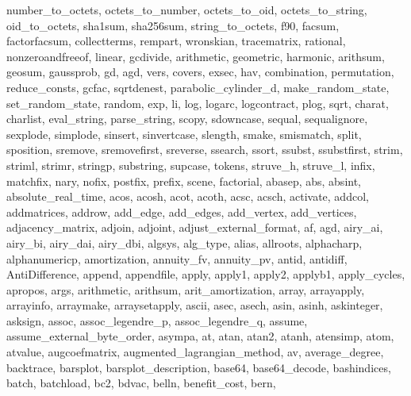 {{    number_to_octets,
    octets_to_number,
    octets_to_oid,
    octets_to_string,
    oid_to_octets,
    sha1sum,
    sha256sum,
    string_to_octets,
    f90,
    facsum,
    factorfacsum,
    collectterms,
    rempart,
    wronskian,
    tracematrix,
    rational,
    nonzeroandfreeof,
    linear,
    gcdivide,
    arithmetic,
    geometric,
    harmonic,
    arithsum,
    geosum,
    gaussprob,
    gd,
    agd,
    vers,
    covers,
    exsec,
    hav,
    combination,
    permutation,
    reduce_consts,
    gcfac,
    sqrtdenest,
    parabolic_cylinder_d,
    make_random_state,
    set_random_state,
    random,
    exp,
    li,
    log,
    logarc,
    logcontract,
    plog,
    sqrt,
    charat,
    charlist,
    eval_string,
    parse_string,
    scopy,
    sdowncase,
    sequal,
    sequalignore,
    sexplode,
    simplode,
    sinsert,
    sinvertcase,
    slength,
    smake,
    smismatch,
    split,
    sposition,
    sremove,
    sremovefirst,
    sreverse,
    ssearch,
    ssort,
    ssubst,
    ssubstfirst,
    strim,
    striml,
    strimr,
    stringp,
    substring,
    supcase,
    tokens,
    struve_h,
    struve_l,
    infix,
    matchfix,
    nary,
    nofix,
    postfix,
    prefix,
    scene,
    factorial,
    abasep,
    abs,
    absint,
    absolute_real_time,
    acos,
    acosh,
    acot,
    acoth,
    acsc,
    acsch,
    activate,
    addcol,
    addmatrices,
    addrow,
    add_edge,
    add_edges,
    add_vertex,
    add_vertices,
    adjacency_matrix,
    adjoin,
    adjoint,
    adjust_external_format,
    af,
    agd,
    airy_ai,
    airy_bi,
    airy_dai,
    airy_dbi,
    algsys,
    alg_type,
    alias,
    allroots,
    alphacharp,
    alphanumericp,
    amortization,
    annuity_fv,
    annuity_pv,
    antid,
    antidiff,
    AntiDifference,
    append,
    appendfile,
    apply,
    apply1,
    apply2,
    applyb1,
    apply_cycles,
    apropos,
    args,
    arithmetic,
    arithsum,
    arit_amortization,
    array,
    arrayapply,
    arrayinfo,
    arraymake,
    arraysetapply,
    ascii,
    asec,
    asech,
    asin,
    asinh,
    askinteger,
    asksign,
    assoc,
    assoc_legendre_p,
    assoc_legendre_q,
    assume,
    assume_external_byte_order,
    asympa,
    at,
    atan,
    atan2,
    atanh,
    atensimp,
    atom,
    atvalue,
    augcoefmatrix,
    augmented_lagrangian_method,
    av,
    average_degree,
    backtrace,
    barsplot,
    barsplot_description,
    base64,
    base64_decode,
    bashindices,
    batch,
    batchload,
    bc2,
    bdvac,
    belln,
    benefit_cost,
    bern,
}}
